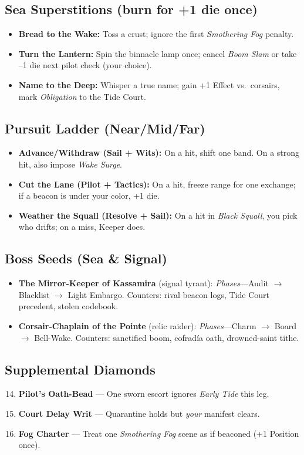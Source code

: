 \subsection*{Sea Superstitions (burn for +1 die once)}
\begin{itemize}
  \item \textbf{Bread to the Wake:} Toss a crust; ignore the first \emph{Smothering Fog} penalty.
  \item \textbf{Turn the Lantern:} Spin the binnacle lamp once; cancel \emph{Boom Slam} or take --1 die next pilot check (your choice).
  \item \textbf{Name to the Deep:} Whisper a true name; gain +1 Effect vs.\ corsairs, mark \emph{Obligation} to the Tide Court.
\end{itemize}

\subsection*{Pursuit Ladder (Near/Mid/Far)}
\begin{itemize}
  \item \textbf{Advance/Withdraw (Sail + Wits):} On a hit, shift one band. On a strong hit, also impose \emph{Wake Surge}.
  \item \textbf{Cut the Lane (Pilot + Tactics):} On a hit, freeze range for one exchange; if a beacon is under your color, +1 die.
  \item \textbf{Weather the Squall (Resolve + Sail):} On a hit in \emph{Black Squall}, you pick who drifts; on a miss, Keeper does.
\end{itemize}

\subsection*{Boss Seeds (Sea \& Signal)}
\begin{itemize}
  \item \textbf{The Mirror-Keeper of Kassamira} (signal tyrant): \emph{Phases}—Audit $\rightarrow$ Blacklist $\rightarrow$ Light Embargo. Counters: rival beacon logs, Tide Court precedent, stolen codebook.
  \item \textbf{Corsair-Chaplain of the Pointe} (relic raider): \emph{Phases}—Charm $\rightarrow$ Board $\rightarrow$ Bell-Wake. Counters: sanctified boom, cofradía oath, drowned-saint tithe.
\end{itemize}

\subsection*{Supplemental Diamonds}
\begin{enumerate}
\setcounter{enumi}{13}
  \item \textbf{Pilot’s Oath-Bead} --- One sworn escort ignores \emph{Early Tide} this leg.
  \item \textbf{Court Delay Writ} --- Quarantine holds but \emph{your} manifest clears.
  \item \textbf{Fog Charter} --- Treat one \emph{Smothering Fog} scene as if beaconed (+1 Position once).
\end{enumerate}